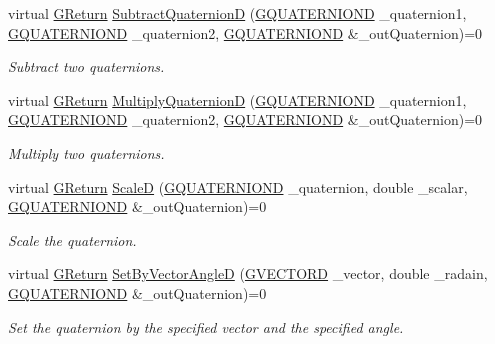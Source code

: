 \begin{DoxyCompactItemize}
virtual \hyperlink{namespaceGW_a67a839e3df7ea8a5c5686613a7a3de21}{G\+Return} \hyperlink{classGW_1_1MATH_1_1GQuaternion_a52f17b2b05d7ffa5176d7e83c40b9ffe}{Subtract\+QuaternionD} (\hyperlink{structGW_1_1MATH_1_1GQUATERNIOND}{G\+Q\+U\+A\+T\+E\+R\+N\+I\+O\+ND} \+\_\+quaternion1, \hyperlink{structGW_1_1MATH_1_1GQUATERNIOND}{G\+Q\+U\+A\+T\+E\+R\+N\+I\+O\+ND} \+\_\+quaternion2, \hyperlink{structGW_1_1MATH_1_1GQUATERNIOND}{G\+Q\+U\+A\+T\+E\+R\+N\+I\+O\+ND} \&\+\_\+out\+Quaternion)=0
\begin{DoxyCompactList}\small\item\em Subtract two quaternions. \end{DoxyCompactList}\item 
virtual \hyperlink{namespaceGW_a67a839e3df7ea8a5c5686613a7a3de21}{G\+Return} \hyperlink{classGW_1_1MATH_1_1GQuaternion_ae75906631438f250ab696aff9e117ede}{Multiply\+QuaternionD} (\hyperlink{structGW_1_1MATH_1_1GQUATERNIOND}{G\+Q\+U\+A\+T\+E\+R\+N\+I\+O\+ND} \+\_\+quaternion1, \hyperlink{structGW_1_1MATH_1_1GQUATERNIOND}{G\+Q\+U\+A\+T\+E\+R\+N\+I\+O\+ND} \+\_\+quaternion2, \hyperlink{structGW_1_1MATH_1_1GQUATERNIOND}{G\+Q\+U\+A\+T\+E\+R\+N\+I\+O\+ND} \&\+\_\+out\+Quaternion)=0
\begin{DoxyCompactList}\small\item\em Multiply two quaternions. \end{DoxyCompactList}\item 
virtual \hyperlink{namespaceGW_a67a839e3df7ea8a5c5686613a7a3de21}{G\+Return} \hyperlink{classGW_1_1MATH_1_1GQuaternion_ad65dc6353347a103c79a1e4f4a3b8534}{ScaleD} (\hyperlink{structGW_1_1MATH_1_1GQUATERNIOND}{G\+Q\+U\+A\+T\+E\+R\+N\+I\+O\+ND} \+\_\+quaternion, double \+\_\+scalar, \hyperlink{structGW_1_1MATH_1_1GQUATERNIOND}{G\+Q\+U\+A\+T\+E\+R\+N\+I\+O\+ND} \&\+\_\+out\+Quaternion)=0
\begin{DoxyCompactList}\small\item\em Scale the quaternion. \end{DoxyCompactList}\item 
virtual \hyperlink{namespaceGW_a67a839e3df7ea8a5c5686613a7a3de21}{G\+Return} \hyperlink{classGW_1_1MATH_1_1GQuaternion_a6d27eb89fc133c7746e2373cc2e0a3c4}{Set\+By\+Vector\+AngleD} (\hyperlink{structGW_1_1MATH_1_1GVECTORD}{G\+V\+E\+C\+T\+O\+RD} \+\_\+vector, double \+\_\+radain, \hyperlink{structGW_1_1MATH_1_1GQUATERNIOND}{G\+Q\+U\+A\+T\+E\+R\+N\+I\+O\+ND} \&\+\_\+out\+Quaternion)=0
\begin{DoxyCompactList}\small\item\em Set the quaternion by the specified vector and the specified angle. \end{DoxyCompactList}\item 

\end{DoxyCompactItemize}

